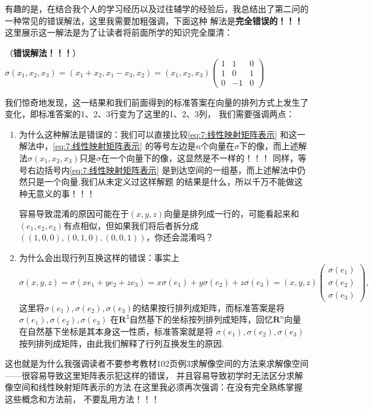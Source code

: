 有趣的是，在结合我个人的学习经历以及过往辅学的经验后，我总结出了第二问的一种常见的错误解法，这里我需要加粗强调，下面这种
解法是\textbf{完全错误的！！！}这里展示这一解法是为了让读者将前面所学的知识完全厘清：

\begin{solution}
    （\textbf{\songti 错误解法！！！}）$\sigma(x_1,x_2,x_3)=(x_1+x_2,x_1-x_3, x_2)=(x_1,x_2,x_3)\begin{pmatrix}
        1 & 1 & 0 \\
        1 & 0 & 1 \\
        0 & -1 & 0
    \end{pmatrix}$
\end{solution}

我们惊奇地发现，这一结果和我们前面得到的标准答案在向量的排列方式上发生了变化，即标准答案的1、2、3行变为了这里的1、2、3列，
我们需要强调两点：
\begin{enumerate}
    \item 为什么这种解法是错误的：我们可以直接比较\autoref{eq:7:线性映射矩阵表示} 和这一解法中，\autoref*{eq:7:线性映射矩阵表示}
    的等号左边是$n$个向量在$\sigma$下的像，而上述解法$\sigma(x_1,x_2,x_3)$只是$\sigma$在一个向量下的像，这显然是不一样的！！！
    同样，等号右边括号内\autoref*{eq:7:线性映射矩阵表示} 是到达空间的一组基，而上述解法中仍然只是一个向量.我们从未定义过这样解题
    的结果是什么，所以千万不能做这种无意义的事！！！

    容易导致混淆的原因可能在于$(x,y,z)$向量是排列成一行的，可能看起来和$(e_1,e_2,e_3)$有点相似，但如果我们将后者拆分成
    $((1,0,0),(0,1,0),(0,0,1))$，你还会混淆吗？

    \item 为什么会出现行列互换这样的错误：事实上
    \[\sigma(x,y,z)=\sigma(xe_1+ye_2+ze_3)=x\sigma(e_1)+y\sigma(e_2)+z\sigma(e_3)=(x,y,z)\begin{pmatrix}
        \sigma(e_1) \\ \sigma(e_2) \\ \sigma(e_3)
    \end{pmatrix},\]
    这里将$\sigma(e_1),\sigma(e_2),\sigma(e_3)$的结果按行排列成矩阵，而标准答案是将$\sigma(e_1),\sigma(e_2),\sigma(e_3)$
    在$\mathbf{R}^3$自然基下的坐标按列排列成矩阵，回忆$\mathbf{R}^n$向量在自然基下坐标是其本身这一性质，标准答案就是将
    $\sigma(e_1),\sigma(e_2),\sigma(e_3)$按列排列成矩阵，由此我们解释了行列互换发生的原因.
\end{enumerate}

这也就是为什么我强调读者不要参考教材102页例3求解像空间的方法来求解像空间——很容易导致这里矩阵表示犯这样的错误，
并且容易导致初学时无法区分求解像空间和线性映射矩阵表示的方法.在这里我必须再次强调：在没有完全熟练掌握这些概念和方法前，
不要乱用方法！！！

